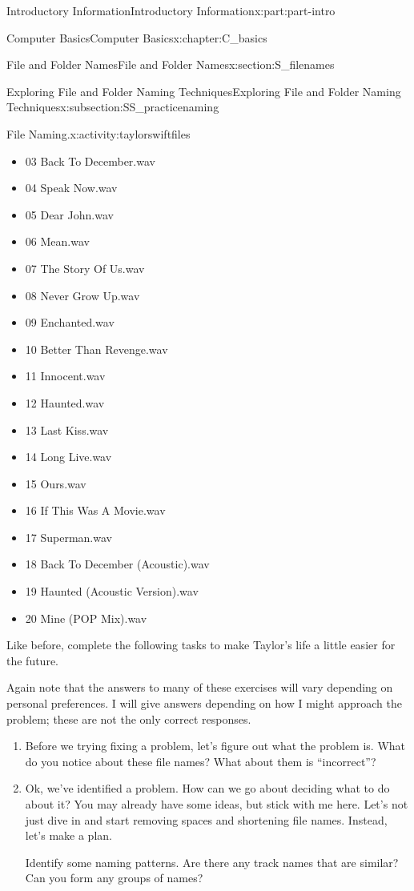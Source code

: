 \documentclass[oneside,10pt,]{book}
\begin{document}
\begin{partptx}{Introductory Information}{}{Introductory Information}{}{}{x:part:part-intro}
\begin{chapterptx}{Computer Basics}{}{Computer Basics}{}{}{x:chapter:C_basics}
\begin{sectionptx}{File and Folder Names}{}{File and Folder Names}{}{}{x:section:S_filenames}
\begin{subsectionptx}{Exploring File and Folder Naming Techniques}{}{Exploring File and Folder Naming Techniques}{}{}{x:subsection:SS_practicenaming}
\begin{activity}{File Naming.}{x:activity:taylorswiftfiles}
\begin{multicols}{2}
\begin{itemize}[label=\textbullet]
\item{}03 Back To December.wav%
\item{}04 Speak Now.wav%
\item{}05 Dear John.wav%
\item{}06 Mean.wav%
\item{}07 The Story Of Us.wav%
\item{}08 Never Grow Up.wav%
\item{}09 Enchanted.wav%
\item{}10 Better Than Revenge.wav%
\item{}11 Innocent.wav%
\item{}12 Haunted.wav%
\item{}13 Last Kiss.wav%
\item{}14 Long Live.wav%
\item{}15 Ours.wav%
\item{}16 If This Was A Movie.wav%
\item{}17 Superman.wav%
\item{}18 Back To December (Acoustic).wav%
\item{}19 Haunted (Acoustic Version).wav%
\item{}20 Mine (POP Mix).wav%
\end{itemize}
\end{multicols}
%
\par
Like before, complete the following tasks to make Taylor's life a little easier for the future.%
\par
Again note that the answers to many of these exercises will vary depending on personal preferences. I will give answers depending on how I might approach the problem; these are not the only correct responses.%
\begin{enumerate}[font=\bfseries,label=(\alph*),ref=\alph*]
\item{}Before we trying fixing a problem, let's figure out what the problem is. What do you notice about these file names? What about them is ``incorrect''?%
\item\label{x:task:taylorswiftgroups2}Ok, we've identified a problem. How can we go about deciding what to do about it? You may already have some ideas, but stick with me here. Let's not just dive in and start removing spaces and shortening file names. Instead, let's make a plan.%
\par
Identify some naming patterns. Are there any track names that are similar? Can you form any groups of names?%

\end{enumerate}
\end{activity}
\end{subsectionptx}
\end{sectionptx}
\end{chapterptx}
\end{partptx}
\end{document}
